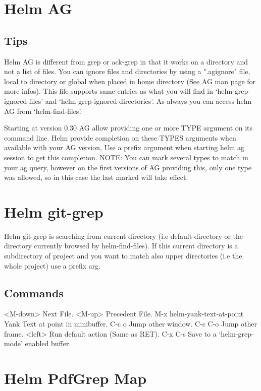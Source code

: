 \documentclass[11pt]{article}
\begin{document}
\section{Helm AG}
\label{sec:org7254f8c}

\subsection{Tips}
\label{sec:orgfd604cf}

Helm AG is different from grep or ack-grep in that it works on a directory and not
a list of files.
You can ignore files and directories by using a ".agignore" file, local to directory
or global when placed in home directory (See AG man page for more infos).
This file supports same entries as what you will find in ‘helm-grep-ignored-files’ and
‘helm-grep-ignored-directories’.
As always you can access helm AG from ‘helm-find-files’.

Starting at version 0.30 AG allow providing one or more TYPE argument on its command line.
Helm provide completion on these TYPES arguments when available with your AG version,
Use a prefix argument when starting helm ag session to get this completion.
NOTE: You can mark several types to match in your ag query, however on the first versions of
AG providing this, only one type was allowed, so in this case the last marked will take effect.

\section{Helm git-grep}
\label{sec:orgf316f0e}

Helm git-grep is searching from current directory
(i.e default-directory or the directory currently browsed by helm-find-files).
If this current directory is a subdirectory of project and you want to match
also upper directories (i.e the whole project) use a prefix arg.

\subsection{Commands}
\label{sec:org91e22c4}

<M-down>		Next File.
<M-up>		Precedent File.
M-x helm-yank-text-at-point		Yank Text at point in minibuffer.
C-c o		Jump other window.
C-c C-o		Jump other frame.
<left>		Run default action (Same as RET).
C-x C-s		Save to a ‘helm-grep-mode’ enabled buffer.

\section{Helm PdfGrep Map}
\label{sec:org0908473}
\end{document}
